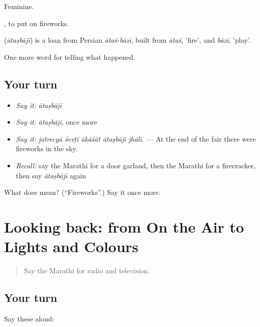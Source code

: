 Feminine.

 , to put on fireworks.

\begin{cousinweb}
\textbf{} (\emph{ātaṣbājī}) is a loan from Persian \emph{ātaš-bāzī}, built from \emph{ātaš}, 'fire', and \emph{bāzī}, 'play'.
\end{cousinweb}

\begin{grammarlens}[title={What you've built}]
One more word for telling what happened.
\end{grammarlens}

\subsection*{Your turn}
\begin{itemize}
\raggedright
  \item \emph{Say it:} \emph{ātaṣbājī}
  \item \emph{Say it:} \emph{ātaṣbājī}, once more
  \item \emph{Say it:} \emph{jatrecyā śevṭī ākāśāt ātaṣbājī jhālī.} — At the end of the fair there were fireworks in the sky.
  \item \emph{Recall:} say the Marathi for a door garland, then the Marathi for a firecracker, then say \emph{ātaṣbājī} again
\end{itemize}

\begin{tcolorbox}[breakable,colback=teal!4,colframe=teal!35!black,title={Before you move on}]
What does  mean? (\textquotedblleft{}Fireworks\textquotedblright{}.) Say it once more.
\end{tcolorbox}
\section[(dialogue)]{Looking back: from On the Air to Lights and Colours}

\label{lesson:MR-R319-review-312-319}



\begin{quote}
Say the Marathi for radio and television.
\end{quote}

\subsection*{Your turn}
Say these aloud:

